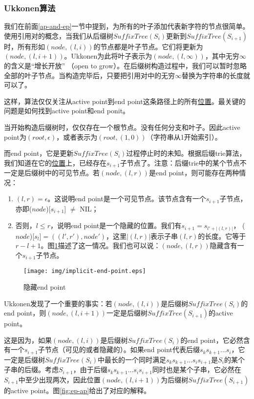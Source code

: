 \documentclass[UTF8]{article}
\begin{document}
\subsubsection{Ukkonen算法}

我们在前面\ref{ap-and-ep}一节中提到，为所有的叶子添加代表新字符的节点很简单。使用引用对的概念，当我们从后缀树$SuffixTree(S_i)$更新到$SuffixTree(S_{i+1})$时，所有形如$(node, (l, i))$的节点都是叶子节点。它们将更新为$(node, (l, i+1))$。Ukkonen为此将叶子表示为$(node, (l, \infty))$，其中无穷$\infty$的含义是“增长开放”
（open to grow）。在后缀树构造过程中，我们可以暂时忽略全部的叶子节点。当构造完毕后，只要把引用对中的无穷$\infty$替换为字符串的长度就可以了。

这样，算法仅仅关注从active point到end point这条路径上的所有\underline{位置}。最关键的问题是如何找到active point和end ponit。

当开始构造后缀树时，仅仅存在一个根节点。没有任何分支和叶子。因此active point为$(root, \epsilon)$，或者表示为$(root, (1, 0))$（字符串从1开始索引）。

而end point，它是更新$SuffixTree(S_i)$过程停止时的未知。根据后缀trie算法，我们知道在它的\underline{位置}上，已经存在$s_{i+1}$子节点了。注意：后缀trie中的某个节点不一定是后缀树中的可见节点。若$(node, (l, r))$是end point，则可能存在两种情况：

\begin{enumerate}
\item $(l, r)=\epsilon$。这说明end point是一个可见节点。该节点含有一个$s_{i+1}$子节点，亦即($node$)[$s_{i+1}$] $\neq$ NIL；
\item 否则，$l \leq r$，说明end point是一个隐藏的位置。我们有$s_{i+1}=s_{l'+|(l, r)|}$，
($node$)[$s_l$]$=((l', r'), node')$，这里$|(l, r)|$表示子串$(l, r)$的长度。它等于$r-l+1$。图\ref{fig:implicit-end-point}描述了这一情况。我们也可以说：$(node, (l, r))$隐藏含有一个$s_{i+1}$子节点。
\end{enumerate}

\begin{figure}[htbp]
  \centering
  \texttt{[image: img/implicit-end-point.eps]}
  \caption{隐藏end point}
  \label{fig:implicit-end-point}
\end{figure}

Ukkonen发现了一个重要的事实：若$(node, (l, i))$是后缀树$SuffixTree(S_i)$的end point，则$(node, (l, i+1))$一定是后缀树$SuffixTree(S_{i+1})$的active point。

这是因为，如果$(node, (l, i))$是后缀树$SuffixTree(S_i)$的end point，它必然含有一个$s_{i+1}$子节点（可见的或者隐藏的）。如果end point代表后缀$s_ks_{k+1}...s_i$，它一定是后缀树$SuffixTree(S_i)$中最长的一个同时满足$s_ks_{k+1}...s_is_{i+1}$是$S_i$的某个子串的后缀。考虑$S_{i+1}$，由于后缀$s_ks_{k+1}...s_is_{i+1}$同时也是某个子串，它必然在$S_{i+1}$中至少出现两次，因此位置$(node, (l, i+1))$为后缀树$SuffixTree(S_{i+1})$的active point。图\ref{fig:ep-ap}给出了对应的解释。
\end{document}

